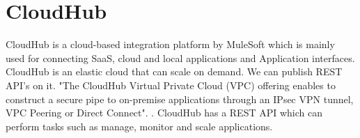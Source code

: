 \section{CloudHub}

CloudHub is a cloud-based integration platform by MuleSoft which is mainly 
used for connecting SaaS, cloud and local applications and Application 
interfaces. CloudHub is an elastic cloud that can scale on demand. We can 
publish REST API's on it. "The CloudHub Virtual Private Cloud (VPC) offering 
enables to construct a secure pipe to on-premise applications through an 
IPsec VPN tunnel, VPC Peering or Direct Connect". 
\cite{hid-sp18-418-CloudHub-docs}. CloudHub has a REST API which can perform 
tasks such as manage, monitor and scale applications.


